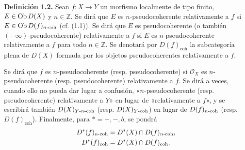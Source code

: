 \providecommand{\sisi}[2]{#2}

\textbf{Definición 1.2.} Sean \(f:X\to Y\) un morfismo localmente de tipo finito, \(E\in\operatorname{Ob} D(X)\) y \(n\in\mathbb Z\). Se dirá que \(E\) es \(n\)-pseudocoherente relativamente a \(f\) si \(E\in\operatorname{Ob} D(f)_{n\text{-}\mathrm{coh}}\) (cf. (1.1)). Se dirá que \(E\) es pseudocoherente (o también \((-\infty)\)-pseudocoherente) relativamente a \(f\) si \(E\) es \(n\)-pseudocoherente relativamente a \(f\) para todo \(n\in\mathbb Z\). Se denotará por \(D(f)_{\mathrm{coh}}\) la subcategoría plena de \(D(X)\) formada por los objetos pseudocoherentes relativamente a \(f\).

Se dirá que \(f\) es \(n\)-pseudocoherente (resp. pseudocoherente) si \(\mathcal O_X\) es \(n\)-pseudocoherente (resp. pseudocoherente) relativamente a \(f\). Se dirá a veces, cuando ello no pueda dar lugar a confusión, «\(n\)-pseudocoherente (resp. pseudocoherente) relativamente a \(Y\)» en lugar de «relativamente a \(f\)», y se escribirá también \(D(X)_{Y\text{-}n\text{-}\mathrm{coh}}\) (resp. \(D(X)_{Y\text{-}\mathrm{coh}}\)) en lugar de \(D(f)_{n\text{-}\mathrm{coh}}\) (resp. \(D(f)_{\mathrm{coh}}\)). Finalmente, para \(*=+,-,b\), se pondrá
\[
\begin{gathered}
 D^*(f)_{n\text{-}\mathrm{coh}}=D^*(X)\cap D(f)_{n\text{-}\mathrm{coh}},\\
 D^*(f)_{\mathrm{coh}}=D^*(X)\cap D(f)_{\mathrm{coh}}.
\end{gathered}
\]

